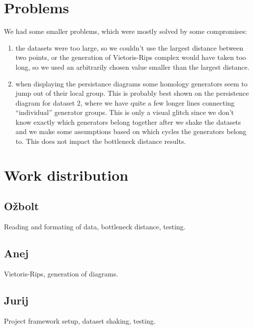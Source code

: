 \documentclass[11pt]{article}
\begin{document}
\section{\label{probs}Problems}

We had some smaller problems, which were mostly solved by some compromises:

\begin{enumerate}
\item the datasets were too large, so we couldn't use the largest distance between two points, or the generation of Vietoris-Rips complex would have taken too long, so we used an arbitrarily chosen value smaller than the largest distance. 

\item when displaying the persistance diagrams some homology generators seem to jump out of their local group. This is probably best shown on the persistence diagram for dataset 2, where we have quite a few longer lines connecting ``individual'' generator groups. This is only a visual glitch since we don't know exactly which generators belong together after we shake the datasets and we make some assumptions based on which cycles the generators belong to. This does not impact the bottleneck distance results. 
\end{enumerate}

\section{Work distribution}

\subsection{Ožbolt}
Reading and formating of data, bottleneck distance, testing.

\subsection{Anej}
Vietoris-Rips, generation of diagrams.

\subsection{Jurij}
Project framework setup, dataset shaking, testing.

\newpage




\newpage
\end{document}

